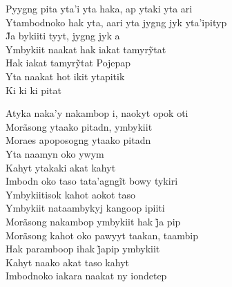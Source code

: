 \noindent   Pyygng pita yta'i yta haka, ap ytaki yta ari\\
  Ytambodnoko hak yta, aari yta jygng jyk yta'ipityp\\
  J̃a bykiiti tyyt, jygng jyk a\\
  Ymbykiit naakat hak iakat tamyrỹtat\\
  Hak iakat tamyrỹtat Pojepap\\
  Yta naakat hot ikit ytapitik\\
  Ki ki ki pitat

\smallskip
 \begin{center}\end{center}
 \smallskip

\noindent   Atyka naka'y nakambop i, naokyt opok oti\\
  Morãsong ytaako pitadn, ymbykiit\\
  Moraes apoposogng ytaako pitadn\\
  Yta naamyn oko ywym\\
  Kahyt ytakaki akat kahyt\\
  Imbodn oko taso tata’agngĩt bowy tykiri\\
  Ymbykiitisok kahot aokot taso\\
  Ymbykiit nataambykyj kangoop ipiiti\\
  Morãsong nakambop ymbykiit hak j̃a pip\\
  Morãsong kahot oko pawyyt taakan, taambip\\
  Hak paramboop ihak j̃apip ymbykiit\\
  Kahyt naako akat taso kahyt\\
  Imbodnoko iakara naakat ny iondetep
